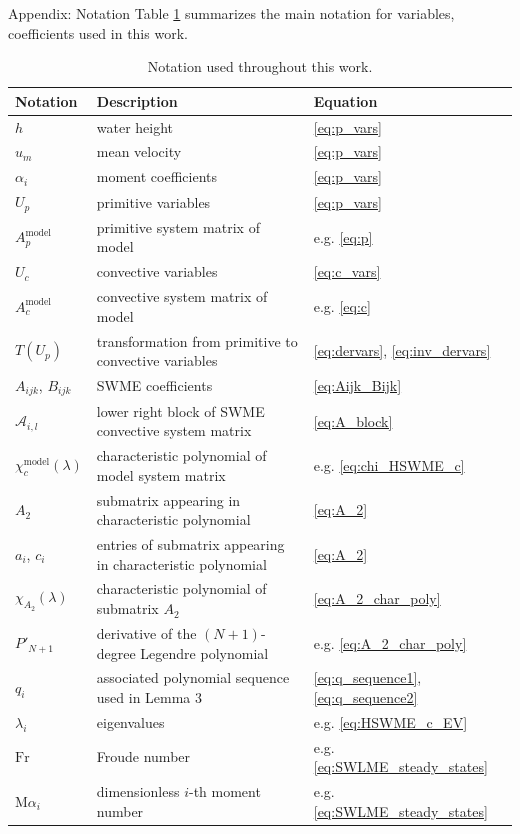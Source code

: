 \documentclass[a4paper, 11pt]{article}
\newcommand{\Fr}{\textrm{Fr}} %
\newcommand{\Ma}{\textrm{M}\alpha} %
\begin{document}
\appendix
\begin{section}{Appendix: Notation}
Table \ref{tab:variables_formulas} summarizes the main notation for variables, coefficients used in this work.
\begin{table}[h]
\centering
\caption{Notation used throughout this work.}
\label{tab:variables_formulas}
\begin{tabular}{|l|l|l|}
\hline
\textbf{Notation} & \textbf{Description} & \textbf{Equation} \\ \hline
$h$ & water height & \eqref{eq:p_vars} \\ \hline
$u_m$ & mean velocity & \eqref{eq:p_vars} \\ \hline
$\alpha_i$ & moment coefficients & \eqref{eq:p_vars} \\ \hline
$U_{p}$ & primitive variables & \eqref{eq:p_vars} \\ \hline
$A^{\textrm{model}}_{p}$ & primitive system matrix of model & e.g. \eqref{eq:p} \\ \hline
$U_{c}$ & convective variables & \eqref{eq:c_vars} \\ \hline
$A^{\textrm{model}}_{c}$ & convective system matrix of model & e.g. \eqref{eq:c} \\ \hline
$T(U_p)$ & transformation from primitive to convective variables & \eqref{eq:dervars}, \eqref{eq:inv_dervars} \\ \hline
$A_{i j k}$, $B_{i j k}$ & SWME coefficients & \eqref{eq:Aijk_Bijk} \\ \hline
$\mathcal{A}_{i,l}$ & lower right block of SWME convective system matrix & \eqref{eq:A_block} \\ \hline
$\chi_c^{\textrm{model}}(\lambda)$ & characteristic polynomial of model system matrix & e.g. \eqref{eq:chi_HSWME_c} \\ \hline
$A_2$ & submatrix appearing in characteristic polynomial & \eqref{eq:A_2} \\ \hline
$a_i$, $c_i$ & entries of submatrix appearing in characteristic polynomial & \eqref{eq:A_2} \\ \hline
$\chi_{A_2}(\lambda)$ & characteristic polynomial of submatrix $A_2$ & \eqref{eq:A_2_char_poly} \\ \hline
$P'_{N+1}$ & derivative of the $(N+1)$-degree Legendre polynomial & e.g. \eqref{eq:A_2_char_poly} \\ \hline
$q_i$ & associated polynomial sequence used in Lemma 3 & \eqref{eq:q_sequence1}, \eqref{eq:q_sequence2} \\ \hline
$\lambda_i$ & eigenvalues & e.g. \eqref{eq:HSWME_c_EV} \\ \hline
$\Fr$ & Froude number & e.g. \eqref{eq:SWLME_steady_states} \\ \hline
$\Ma_i$ & dimensionless $i$-th moment number & e.g. \eqref{eq:SWLME_steady_states} \\ \hline
\end{tabular}
\end{table}


\end{section}



\end{document}
